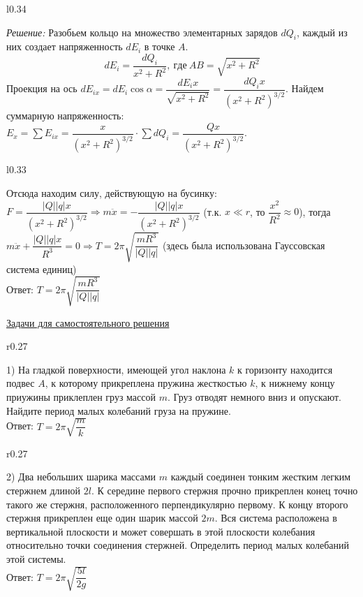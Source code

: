 \documentclass[a4paper,12pt]{article} %
\begin{document}
\begin{wrapfigure}{l}{0.34\textwidth}
	\vspace{-5ex}
	
	\vspace{-15ex}
\end{wrapfigure}

\textit{Решение:} Разобьем кольцо на множество элементарных зарядов $dQ_i$, каждый из них создает
напряженность $dE_i$ в точке $A$. 
$$dE_i = \dfrac{dQ_i}{x^2+R^2},\ где\ AB=\sqrt{x^2+R^2}$$
Проекция на ось $dE_{ix} = dE_i\cos\alpha = \dfrac{dE_i x}{\sqrt{x^2+R^2}}=\dfrac{dQ_ix}{(x^2+R^2)^{3/2}}$.
Найдем суммарную напряженность: $E_x=\sum E_{ix} = \dfrac{x}{(x^2+R^2)^{3/2}}\cdot\sum dQ_i = \dfrac{Qx}{(x^2+R^2)^{3/2}}$.

\begin{wrapfigure}{l}{0.33\textwidth}
	\vspace{-2ex}
	
	\vspace{-15ex}
\end{wrapfigure}
Отсюда находим силу, действующую на бусинку: $F=\dfrac{|Q||q|x}{(x^2+R^2)^{3/2}} \Rightarrow m\ddot x=-\dfrac{|Q||q|x}{(x^2+R^2)^{3/2}}$
(т.к. $x \ll r$, то $\dfrac{x^2}{R^2}\approx 0$), тогда $m\ddot x + \dfrac{|Q||q|x}{R^3}=0 \Rightarrow T=2\pi\sqrt{\dfrac{mR^3}{|Q||q|}}$
(здесь была использована Гауссовская система единиц)\\
Ответ: $T=2\pi\sqrt{\dfrac{mR^3}{|Q||q|}}$

\begin{center}
\underline{Задачи для самостоятельного решения}
\end{center}

\begin{wrapfigure}{r}{0.27\textwidth}
	\vspace{-3.3ex}
	
	\vspace{-7ex}
\end{wrapfigure}
1) На гладкой поверхности, имеющей угол наклона $k$ к горизонту находится
подвес $A$, к которому прикреплена пружина жесткостью $k$, к нижнему концу
приужины приклеплен груз массой $m$. Груз отводят немного вниз и опускают.
Найдите период малых колебаний груза на пружине.\\
Ответ: $T=2\pi\sqrt{\dfrac{m}{k}}$

\begin{wrapfigure}{r}{0.27\textwidth}
	\vspace{-5ex}
	
	\vspace{-7ex}
\end{wrapfigure}
2) Два небольших шарика массами $m$ каждый соединен тонким жестким легким
стержнем длиной $2l$. К середине первого стержня прочно прикреплен конец
точно такого же стержня, расположенного перпендикулярно первому. К концу 
второго стержня прикреплен еще один шарик массой $2m$. Вся система расположена
в вертикальной плоскости и может совершать в этой плоскости колебания относительно
точки соединения стержней. Определить период малых колебаний этой системы.\\
Ответ: $T = 2\pi\sqrt{\dfrac{5l}{2g}}$
\end{document}
